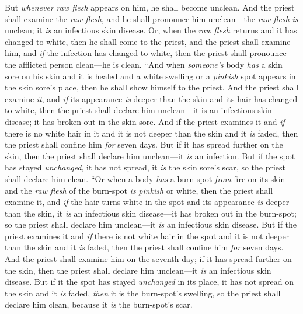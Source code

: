 \begin{biblechapter}
\verse But \textit{whenever} \textit{raw flesh} appears on him, he shall become unclean.
\verse And the priest shall examine the \textit{raw flesh}, and he shall pronounce him unclean—the \textit{raw flesh} \textit{is} unclean; it \textit{is} an infectious skin disease.
\verse Or, when the \textit{raw flesh} returns and it has changed to white, then he shall come to the priest,
\verse and the priest shall examine him, and \textit{if} the infection has changed to white, then the priest shall pronounce the afflicted person clean—he is clean.
\verse “And when \textit{someone’s} body \textit{has} a skin sore on his skin and it is healed
\verse and a white swelling or a \textit{pinkish} spot appears in the skin sore’s place, then he shall show himself to the priest.
\verse And the priest shall examine \textit{it}, and \textit{if} its appearance \textit{is} deeper than the skin and its hair has changed to white, then the priest shall declare him unclean—it is an infectious skin disease; it has broken out in the skin sore.
\verse And if the priest examines it and \textit{if} there is no white hair in it and it is not deeper than the skin and it \textit{is} faded, then the priest shall confine him \textit{for} seven days.
\verse But if it has spread further on the skin, then the priest shall declare him unclean—it \textit{is} an infection.
\verse But if the spot has stayed \textit{unchanged}, it has not spread, it \textit{is} the skin sore’s scar, so the priest shall declare him clean.
\verse “Or when a body \textit{has} a burn-spot \textit{from} fire on its skin and the \textit{raw flesh} of the burn-spot \textit{is} \textit{pinkish} or white,
\verse then the priest shall examine it, and \textit{if} the hair turns white in the spot and its appearance \textit{is} deeper than the skin, it \textit{is} an infectious skin disease—it has broken out in the burn-spot; so the priest shall declare him unclean—it \textit{is} an infectious skin disease.
\verse But if the priest examines it and \textit{if} there is not white hair in the spot and it is not deeper than the skin and it \textit{is} faded, then the priest shall confine him \textit{for} seven days.
\verse And the priest shall examine him on the seventh day; if it has spread further on the skin, then the priest shall declare him unclean—it \textit{is} an infectious skin disease.
\verse But if it the spot has stayed \textit{unchanged} in its place, it has not spread on the skin and it \textit{is} faded, \textit{then} it is the burn-spot’s swelling, so the priest shall declare him clean, because it \textit{is} the burn-spot’s scar.

\end{biblechapter}
